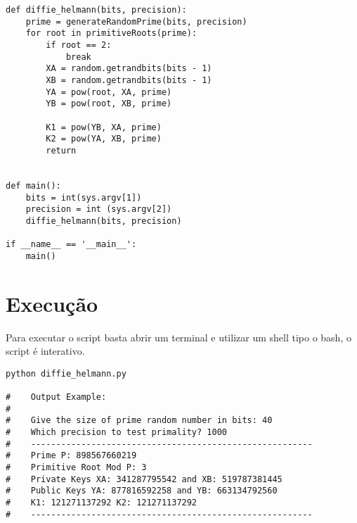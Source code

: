 \documentclass[a4paper,11pt]{article}
\theoremstyle{mytheor}
\begin{document}
\begin{lstlisting}[caption=Diffie Helmann utilizando Miller Rabin em Python.]
def diffie_helmann(bits, precision):
    prime = generateRandomPrime(bits, precision)
    for root in primitiveRoots(prime):
        if root == 2:
            break
        XA = random.getrandbits(bits - 1)
        XB = random.getrandbits(bits - 1)
        YA = pow(root, XA, prime)
        YB = pow(root, XB, prime)

        K1 = pow(YB, XA, prime)
        K2 = pow(YA, XB, prime)
        return


def main():
    bits = int(sys.argv[1])
    precision = int (sys.argv[2])
    diffie_helmann(bits, precision)

if __name__ == '__main__':
    main()

\end{lstlisting}

\section*{Execução}

Para executar o script basta abrir um terminal e utilizar um shell tipo o bash, o script é interativo.

\begin{lstlisting}[label={list:second},caption=Executando o script.]
python diffie_helmann.py

#    Output Example:
#    
#    Give the size of prime random number in bits: 40 
#    Which precision to test primality? 1000
#    --------------------------------------------------------
#    Prime P: 898567660219
#    Primitive Root Mod P: 3
#    Private Keys XA: 341287795542 and XB: 519787381445
#    Public Keys YA: 877816592258 and YB: 663134792560
#    K1: 121271137292 K2: 121271137292
#    --------------------------------------------------------
\end{lstlisting}
\end{document}
